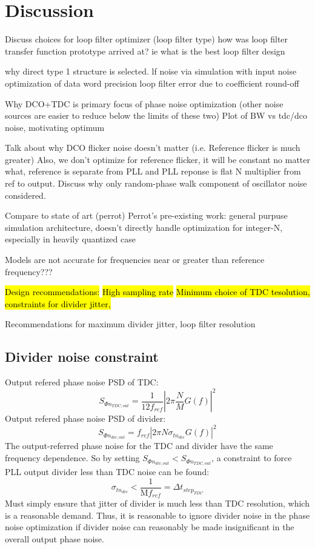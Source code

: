\section{Discussion}\label{disco}
Discuss choices for loop filter optimizer (loop filter type)
	how was loop filter transfer function prototype arrived at?
	ie what is the best loop filter design 

	why direct type 1 structure is selected.
	lf noise via simulation with input noise
	optimization of data word precision
	loop filter error due to coefficient round-off


	Why DCO+TDC is primary focus of phase noise optimization (other noise sources are easier to reduce below the limits of these two)
	Plot of BW vs tdc/dco noise, motivating optimum


Talk about why DCO flicker noise doesn't matter (i.e. Reference flicker is much greater)
	Also, we don't optimize for reference flicker, it will be constant no matter what,
	reference is separate from PLL and PLL reponse is flat N multiplier from ref to output.
	Discuss why only random-phase walk component of oscillator noise considered.

Compare to state of art (perrot)
Perrot's pre-existing work: general purpuse simulation architecture, doesn't directly handle optimization for integer-N, especially in heavily quantized case

Models are not accurate for frequencies near or greater than reference frequency???

\hl{Design recommendations:}
\hl{High sampling rate}
\hl{Minimum choice of TDC tesolution, constraints for divider jitter,}

	Recommendations for maximum divider jitter, loop filter resolution
	\subsection{Divider noise constraint}
		Output refered phase noise PSD of TDC:
		\begin{equation}
			S_{\Phi n_{TDC,out}} = \frac{1}{12 f_{ref}}\left|2\pi\frac{N}{M} G(f) \right|^2
		\end{equation}
		Output refered phase noise PSD of divider:
		\begin{equation}
			S_{\Phi n_{div, out}} = f_{ref} \left|2\pi N \sigma_{tn_{div}} G(f)\right|^2
		\end{equation}
		The output-referred phase noise for the TDC and divider have the same frequency dependence. So by setting $S_{\Phi n_{div, out}} < S_{\Phi n_{TDC,out}}$, a constraint to force PLL output divider less than TDC noise can be found:
		\begin{equation}
			\sigma_{tn_{div}} < \frac{1}{\mathrm{M}f_{ref}} = \Delta t_{step_{TDC}}
		\end{equation}
		Must simply ensure that jitter of divider is much less than TDC resolution, which is a reasonable demand. Thus, it is reasonable to ignore divider noise in the phase noise optimization if divider noise can reasonably be made insignificant in the overall output phase noise.


